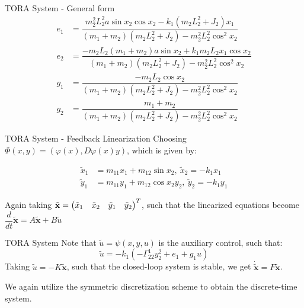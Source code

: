 \documentclass{beamer}
\begin{document}
\begin{frame}{TORA System - General form}
  \begin{equation*}
      \begin{split}
        e_1 &= \dfrac{m_2^2L_2^2 a \sin{x_2}\cos{x_2} - k_1(m_2L_2^2 + J_2)x_1}{(m_1+m_2)(m_2L_2^2 +J_2) - m_2^2L_2^2 \cos^2{x_2}} \\ 
        e_2 &= \dfrac{-m_2L_2(m_1+m_2)a\sin{x_2} + k_1 m_2L_2 x_1 \cos{x_2}} {(m_1+m_2)(m_2L_2^2 +J_2) - m_2^2L_2^2 \cos^2{x_2}} \\
        g_1 &= \dfrac{-m_2L_2\cos{x_2}}{(m_1+m_2)(m_2L_2^2 +J_2) - m_2^2L_2^2 \cos^2{x_2}} \\
        g_2 &= \dfrac{m_1+m_2}{(m_1+m_2)(m_2L_2^2 +J_2) - m_2^2L_2^2 \cos^2{x_2}}
      \end{split}
  \end{equation*}
\end{frame}

\begin{frame}{TORA System - Feedback Linearization}
  Choosing $\Phi(x,y) = \left( \varphi(x), D\varphi(x)y\right)$, which is given by:

  \begin{equation*}
    \begin{split}
      \tilde{x}_1 &= m_{11}x_1 + m_{12}\sin{x_2}, \
      \tilde{x}_2 = -k_1 x_1 \\
      \tilde{y}_1 &= m_{11}y_1 + m_{12}\cos{x_2}y_2, \
      \tilde{y}_2 = -k_1 y_1
    \end{split}
  \end{equation*}

  Again taking $\tilde{\textbf{x}} = \begin{pmatrix}\tilde{x}_1 & \tilde{x}_2 & \tilde{y}_1 & \tilde{y}_2 \end{pmatrix}^T$, such that the linearized equations become $\dfrac{d}{dt} \tilde{\textbf{x}} = A \tilde{\textbf{x}} + B \tilde{u}$
  
\end{frame}

\begin{frame}{TORA System}
  Note that $\tilde{u} = \psi (x, y, u)$ is the auxiliary control, such that:
\begin{equation}
    \tilde{u} = -k_1(-\Gamma_{22}^1 y_2^2 + e_1 + g_1 u)
\end{equation}
Taking $\tilde{u} = -K \tilde{\textbf{x}}$, such that the closed-loop system is stable, we get $\dot{\tilde{\textbf{x}}} = F \tilde{\textbf{x}}$.

We again utilize the symmetric discretization scheme to obtain the discrete-time system.

\end{frame}
\end{document}
